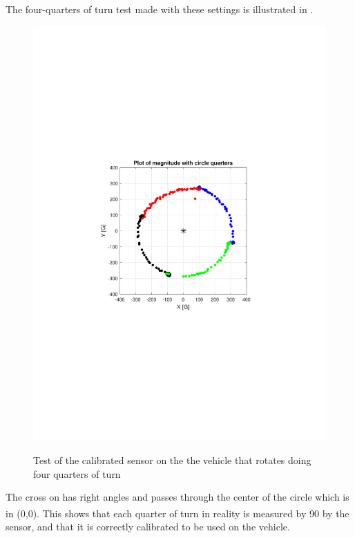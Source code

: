 The four-quarters of turn test made with these settings is illustrated in .
\begin{figure}[H]
    \centering
  {
    \includegraphics[width=1.4\textwidth]{figures/fullturn2.pdf}
  }
  \caption{Test of the calibrated sensor on the the vehicle that rotates doing four quarters of turn}
  \label{fig:calibrationTestQuarterResults}
\end{figure}


The cross on  has right angles and passes through the center of the circle which is in (0,0). This shows that each quarter of turn in reality is measured by \si{90^{\circ}} by the sensor, and that it is correctly calibrated to be used on the vehicle.